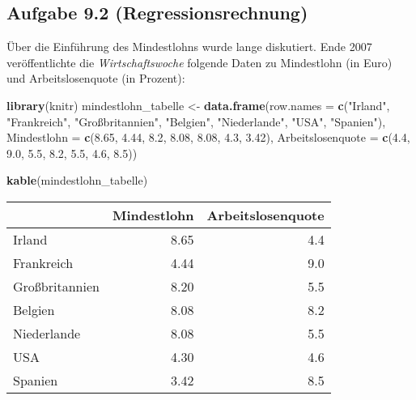 \documentclass[
]{article}
\newenvironment{Shaded}{\begin{snugshade}}{\end{snugshade}}
\newcommand{\AttributeTok}[1]{\textcolor[rgb]{0.13,0.29,0.53}{#1}}
\newcommand{\FloatTok}[1]{\textcolor[rgb]{0.00,0.00,0.81}{#1}}
\newcommand{\FunctionTok}[1]{\textcolor[rgb]{0.13,0.29,0.53}{\textbf{#1}}}
\newcommand{\NormalTok}[1]{#1}
\newcommand{\OtherTok}[1]{\textcolor[rgb]{0.56,0.35,0.01}{#1}}
\newcommand{\StringTok}[1]{\textcolor[rgb]{0.31,0.60,0.02}{#1}}
\begin{document}
\hypertarget{aufgabe-9.2-regressionsrechnung}{%
\subsection{Aufgabe 9.2
(Regressionsrechnung)}\label{aufgabe-9.2-regressionsrechnung}}

Über die Einführung des Mindestlohns wurde lange diskutiert. Ende 2007
veröffentlichte die \emph{Wirtschaftswoche} folgende Daten zu
Mindestlohn (in Euro) und Arbeitslosenquote (in Prozent):

\begin{Shaded}
\begin{Highlighting}[]
\FunctionTok{library}\NormalTok{(knitr)}
\NormalTok{mindestlohn\_tabelle }\OtherTok{\textless{}{-}} \FunctionTok{data.frame}\NormalTok{(}\AttributeTok{row.names =} \FunctionTok{c}\NormalTok{(}\StringTok{"Irland"}\NormalTok{, }\StringTok{"Frankreich"}\NormalTok{, }\StringTok{"Großbritannien"}\NormalTok{, }
                                            \StringTok{"Belgien"}\NormalTok{, }\StringTok{"Niederlande"}\NormalTok{, }\StringTok{"USA"}\NormalTok{, }\StringTok{"Spanien"}\NormalTok{), }
                          \AttributeTok{Mindestlohn =} \FunctionTok{c}\NormalTok{(}\FloatTok{8.65}\NormalTok{, }\FloatTok{4.44}\NormalTok{, }\FloatTok{8.2}\NormalTok{, }\FloatTok{8.08}\NormalTok{, }\FloatTok{8.08}\NormalTok{, }\FloatTok{4.3}\NormalTok{, }\FloatTok{3.42}\NormalTok{), }
                          \AttributeTok{Arbeitslosenquote =} \FunctionTok{c}\NormalTok{(}\FloatTok{4.4}\NormalTok{, }\FloatTok{9.0}\NormalTok{, }\FloatTok{5.5}\NormalTok{, }\FloatTok{8.2}\NormalTok{, }\FloatTok{5.5}\NormalTok{, }\FloatTok{4.6}\NormalTok{, }\FloatTok{8.5}\NormalTok{))}

\FunctionTok{kable}\NormalTok{(mindestlohn\_tabelle)}
\end{Highlighting}
\end{Shaded}

\begin{longtable}[]{@{}lrr@{}}
\toprule\noalign{}
& Mindestlohn & Arbeitslosenquote \\
\midrule\noalign{}
\endhead
\bottomrule\noalign{}
\endlastfoot
Irland & 8.65 & 4.4 \\
Frankreich & 4.44 & 9.0 \\
Großbritannien & 8.20 & 5.5 \\
Belgien & 8.08 & 8.2 \\
Niederlande & 8.08 & 5.5 \\
USA & 4.30 & 4.6 \\
Spanien & 3.42 & 8.5 \\
\end{longtable}
\end{document}
